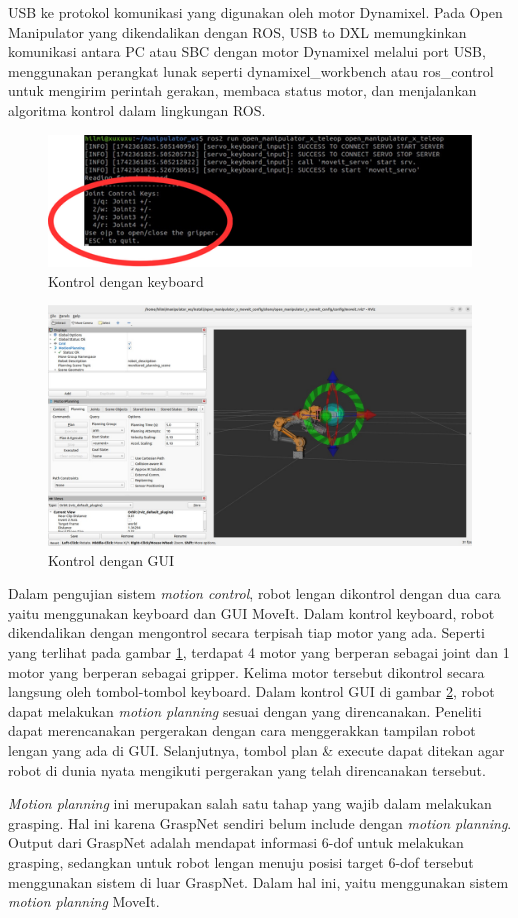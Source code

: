 USB ke protokol komunikasi yang digunakan oleh motor Dynamixel. Pada Open Manipulator yang dikendalikan dengan ROS,
USB to DXL memungkinkan komunikasi antara PC atau SBC dengan motor Dynamixel melalui port USB, menggunakan perangkat lunak
seperti dynamixel\_workbench atau ros\_control untuk mengirim perintah gerakan,
membaca status motor, dan menjalankan algoritma kontrol dalam lingkungan ROS.
\begin{figure} [H] \centering
    \includegraphics[scale=0.8]{gambar/keyboard control anotated.png}
    \caption{Kontrol dengan keyboard}
    \label{fig:keyboard_control}
  \end{figure}
\begin{figure} [H] \centering
    \includegraphics[scale=0.3]{gambar/moveit gui.jpeg}
    \caption{Kontrol dengan GUI}
    \label{fig:moveit_gui}
\end{figure}
Dalam pengujian sistem \emph{motion control}, robot lengan dikontrol dengan dua cara yaitu menggunakan keyboard dan GUI MoveIt.
Dalam kontrol keyboard, robot dikendalikan dengan mengontrol secara terpisah tiap motor yang ada.
Seperti yang terlihat pada gambar \ref{fig:keyboard_control}, terdapat 4 motor yang berperan sebagai joint
dan 1 motor yang berperan sebagai gripper. Kelima motor tersebut dikontrol secara langsung oleh tombol-tombol keyboard.
Dalam kontrol GUI di gambar \ref{fig:moveit_gui}, robot dapat melakukan \emph{motion planning} sesuai dengan yang direncanakan.
Peneliti dapat merencanakan pergerakan dengan cara menggerakkan tampilan robot lengan yang ada di GUI. Selanjutnya,
tombol plan \& execute dapat ditekan agar robot di dunia nyata mengikuti pergerakan yang telah direncanakan tersebut.

\emph{Motion planning} ini merupakan salah satu tahap yang wajib dalam melakukan grasping.
Hal ini karena GraspNet sendiri belum include dengan \emph{motion planning}. Output dari GraspNet
adalah mendapat informasi 6-dof untuk melakukan grasping, sedangkan untuk robot lengan menuju posisi
target 6-dof tersebut menggunakan sistem di luar GraspNet. Dalam hal ini, yaitu menggunakan sistem \emph{motion
planning} MoveIt.